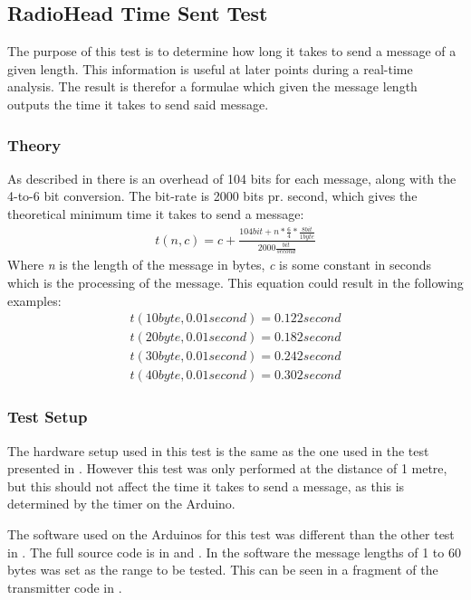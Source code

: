 \subsection{RadioHead Time Sent Test} %
\label{cha:radiohead_time_sent_test}
The purpose of this test is to determine how long it takes to send a message of a given length.
This information is useful at later points during a real-time analysis.
The result is therefor a formulae which given the message length outputs the time it takes to send said message. 

\subsubsection*{Theory}
As described in  there is an overhead of 104 bits for each message, along with the 4-to-6 bit conversion.
The bit-rate is 2000 bits pr. second, which gives the theoretical minimum time it takes to send a message:
\begin{align*}
t(n,c)=c+\frac { 104 bit+n*\frac { 6 }{ 4 } *\frac { 8 bit }{ 1 byte }  }{ 2000\frac { bit }{ second }  } 
\end{align*}
Where \textit{n} is the length of the message in bytes, \textit{c} is some constant in seconds which is the processing of the message. This equation could result in the following examples:
\begin{align*}
t(10 byte, 0.01 second) = 0.122 second\\
t(20 byte, 0.01 second) = 0.182 second\\
t(30 byte, 0.01 second) = 0.242 second\\
t(40 byte, 0.01 second) = 0.302 second
\end{align*}

\subsubsection*{Test Setup}
The hardware setup used in this test is the same as the one used in the test presented in .
However this test was only performed at the distance of 1 metre, but this should not affect the time it takes to send a message, as this is determined by the timer on the Arduino.

The software used on the Arduinos for this test was different than the other test in . 
The full source code is in  and .
In the software the message lengths of 1 to 60 bytes was set as the range to be tested. This can be seen in a fragment of the transmitter code in .

